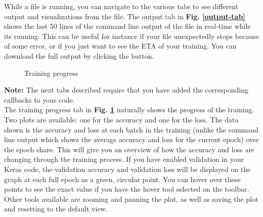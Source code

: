 \noindent While a file is running, you can navigate to the various tabs to see different output and visualizations from the file. The output tab in \textbf{Fig. \ref{output-tab}} shows the last 50 lines of the command line output of the file in real-time while its running. This can be useful for instance if your file unexpectedly stops because of some error, or if you just want to see the ETA of your training. You can download the full output by clicking the button. \\


\begin{figure}[h!]
    \centering
        \caption{Training progress}
        \label{trainingprog-tab}
\end{figure}

\noindent \textbf{Note: }The next tabs described require that you have added the corresponding callbacks to your code. \\ %

\noindent The training progress tab in \textbf{Fig. \ref{trainingprog-tab}} naturally shows the progress of the training. Two plots are available: one for the accuracy and one for the loss. The data shown is the accuracy and loss at each batch in the training (unlike the command line output which shows the average accuracy and loss for the current epoch) over the epoch share. This will give you an overview of how the accuracy and loss are changing through the training process. If you have enabled validation in your Keras code, the validation accuracy and validation loss will be displayed on the graph at each full epoch as a green, circular point. You can hover over these points to see the exact value if you have the hover tool selected on the toolbar. Other tools available are zooming and panning the plot, as well as saving the plot and resetting to the default view. \\

